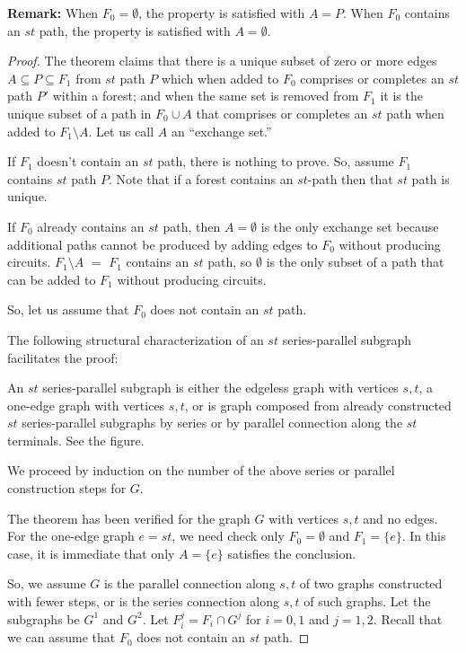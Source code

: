 \documentclass[12pt,leqno]{amsart}
\begin{document}
{\bf Remark:} When $F_0=\emptyset$, the property is satisfied with
$A=P$.  When $F_0$ contains an $st$ path, the property is
satisfied with $A=\emptyset$.

\begin{proof}

The theorem claims that there is a unique subset of
zero or more edges $A\subseteq P\subseteq F_1$ from $st$ path $P$ which 
when added to $F_0$ comprises or completes an $st$ path $P'$ within
a forest; and
when the same set is removed from $F_1$ it is the unique 
subset of a path in $F_0\cup A$ that comprises or completes an $st$ path
when added to $F_1\setminus A$.  Let us call $A$ an ``exchange set.''

If $F_1$ doesn't contain an $st$ path,
there is nothing to prove.  So,  assume $F_1$ contains $st$ path $P$.
Note that if a forest contains an $st$-path then
that $st$ path is unique.

If $F_0$ already contains an $st$ path, then $A=\emptyset$ is the
only exchange set because additional paths cannot be produced by
adding edges to $F_0$ without producing circuits.  $F_1\setminus A$
$=$ $F_1$ contains an $st$ path, so $\emptyset$ is the only 
subset of a path that can be added to $F_1$ without producing circuits.

So, let us assume that $F_0$ does not contain an $st$ path.  

The following structural characterization
of an $st$ series-parallel subgraph
facilitates the proof:

An $st$ series-parallel subgraph
is either the edgeless graph with vertices $s,t$, a one-edge 
graph with vertices $s,t$, or is graph composed from
already constructed $st$ series-parallel subgraphs by series or
by parallel connection along the $st$ terminals.  See the figure.

\begin{center}

\end{center}


We proceed
by induction on the number of the above series or 
parallel construction steps for 
$G$.

The theorem has been verified for the graph $G$ with vertices $s,t$ and no
edges.  For the one-edge graph $e=st$, we need check only $F_0=\emptyset$
and $F_1=\{e\}$.  In this case, it is immediate that only $A=\{e\}$
satisfies the conclusion.

So, we assume $G$ is the parallel connection along $s,t$ of two graphs
constructed with fewer steps, or is the series connection along $s,t$ of such 
graphs.  Let the subgraphs be $G^1$ and $G^2$.
Let $F_i^j=F_i\cap G^j$  for $i=0,1$
and $j=1,2$.  Recall that we can assume that $F_0$ does not
contain an $st$ path.


\end{proof}
\end{document}
